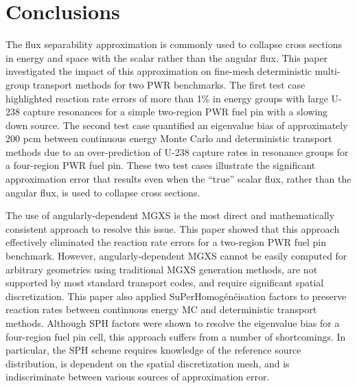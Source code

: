 \section{Conclusions}
\label{sec:conclusions}

The flux separability approximation is commonly used to collapse cross sections in energy and space with the scalar rather than the angular flux. This paper investigated the impact of this approximation on fine-mesh deterministic multi-group transport methods for two PWR benchmarks. The first test case highlighted reaction rate errors of more than 1\% in energy groups with large U-238 capture resonances for a simple two-region PWR fuel pin with a slowing down source. The second test case quantified an eigenvalue bias of approximately 200 pcm between continuous energy Monte Carlo and deterministic transport methods due to an over-prediction of U-238 capture rates in resonance groups for a four-region PWR fuel pin. These two test cases illustrate the significant approximation error that results even when the ``true'' scalar flux, rather than the angular flux, is used to collapse cross sections.


The use of angularly-dependent MGXS is the most direct and mathematically consistent approach to resolve this issue. This paper showed that this approach effectively eliminated the reaction rate errors for a two-region PWR fuel pin benchmark. However, angularly-dependent MGXS cannot be easily computed for arbitrary geometries using traditional MGXS generation methods, are not supported by most standard transport codes, and require significant spatial discretization. This paper also applied SuPerHomog\'{e}n\'{e}isation factors to preserve reaction rates between continuous energy MC and deterministic transport methods. Although SPH factors were shown to resolve the eigenvalue bias for a four-region fuel pin cell, this approach suffers from a number of shortcomings. In particular, the SPH scheme requires knowledge of the reference source distribution, is dependent on the spatial discretization mesh, and is indiscriminate between various sources of approximation error.

